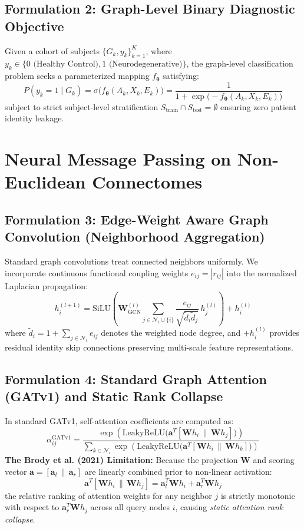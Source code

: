 \documentclass[11pt,a4paper]{article}
\begin{document}
\subsection{Formulation 2: Graph-Level Binary Diagnostic Objective}
Given a cohort of subjects $\{G_k, y_k\}_{k=1}^K$, where $y_k \in \{0 \text{ (Healthy Control)}, 1 \text{ (Neurodegenerative)}\}$, the graph-level classification problem seeks a parameterized mapping $f_{\bm{\theta}}$ satisfying:
\begin{equation}
P(y_k = 1 \mid G_k) = \sigma\big( f_{\bm{\theta}}(A_k, X_k, E_k) \big) = \frac{1}{1 + \exp\big(-f_{\bm{\theta}}(A_k, X_k, E_k)\big)}
\end{equation}
subject to strict subject-level stratification $S_{\text{train}} \cap S_{\text{test}} = \emptyset$ ensuring zero patient identity leakage.

\section{Neural Message Passing on Non-Euclidean Connectomes}

\subsection{Formulation 3: Edge-Weight Aware Graph Convolution (Neighborhood Aggregation)}
Standard graph convolutions treat connected neighbors uniformly. We incorporate continuous functional coupling weights $e_{ij} = |r_{ij}|$ into the normalized Laplacian propagation:
\begin{equation}
h_i^{(l+1)} = \text{SiLU}\left( \bm{W}_{\text{GCN}}^{(l)} \sum_{j \in \mathcal{N}_i \cup \{i\}} \frac{e_{ij}}{\sqrt{\tilde{d}_i \tilde{d}_j}} \, h_j^{(l)} \right) + h_i^{(l)}
\end{equation}
where $\tilde{d}_i = 1 + \sum_{j \in \mathcal{N}_i} e_{ij}$ denotes the weighted node degree, and $+ h_i^{(l)}$ provides residual identity skip connections preserving multi-scale feature representations.

\subsection{Formulation 4: Standard Graph Attention (GATv1) and Static Rank Collapse}
In standard GATv1, self-attention coefficients are computed as:
\begin{equation}
\alpha_{ij}^{\text{GATv1}} = \frac{\exp\left( \text{LeakyReLU}\big( \bm{a}^T [\bm{W} h_i \,\|\, \bm{W} h_j] \big) \right)}{\sum_{k \in \mathcal{N}_i} \exp\left( \text{LeakyReLU}\big( \bm{a}^T [\bm{W} h_i \,\|\, \bm{W} h_k] \big) \right)}
\end{equation}
\textbf{The Brody et al. (2021) Limitation:} Because the projection $\bm{W}$ and scoring vector $\bm{a} = [\bm{a}_l \,\|\, \bm{a}_r]$ are linearly combined prior to non-linear activation:
\begin{equation}
\bm{a}^T [\bm{W} h_i \,\|\, \bm{W} h_j] = \bm{a}_l^T \bm{W} h_i + \bm{a}_r^T \bm{W} h_j
\end{equation}
the relative ranking of attention weights for any neighbor $j$ is strictly monotonic with respect to $\bm{a}_r^T \bm{W} h_j$ across all query nodes $i$, causing \emph{static attention rank collapse}.
\end{document}
